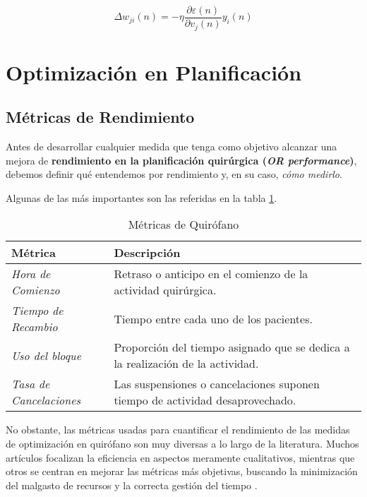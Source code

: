 \begin{equation}
    \Delta w_{ji}(n) = -\eta \frac{\partial \varepsilon (n)}{\partial v_{j}(n)}y_{i}(n)
\end{equation}


\newpage

\section{Optimización en Planificación}


\subsection{Métricas de Rendimiento}

Antes de desarrollar cualquier medida que tenga como objetivo alcanzar una mejora de \textbf{rendimiento en la planificación quirúrgica (\textit{OR performance})}, debemos definir qué entendemos por rendimiento y, en su caso, \textit{cómo medirlo}. 

Algunas de las más importantes son las referidas en  la tabla \ref{Métricas de Quirófano}.
\begin{table}[]
    \centering
    \begin{tabular}{p{7cm}|p{7cm}}
        \toprule
            \textbf{Métrica}   &  \textbf{Descripción}  \\
         \midrule
              \textit{Hora de Comienzo}  &  Retraso o anticipo en el comienzo de la actividad quirúrgica. \\
              \textit{Tiempo de Recambio }& Tiempo entre cada uno de los pacientes. \\
              \textit{Uso del bloque} & Proporción del tiempo asignado que se dedica a la realización de la actividad. \\
              \textit{Tasa de Cancelaciones} & Las suspensiones o cancelaciones suponen tiempo de actividad desaprovechado. \\
       \bottomrule
    \end{tabular}
    \caption{Métricas de Quirófano}
    \label{Métricas de Quirófano}
\end{table}

No obstante, las métricas usadas para cuantificar el rendimiento de las medidas de optimización en quirófano son muy diversas a lo largo de la literatura.
Muchos artículos focalizan la eficiencia en aspectos meramente cualitativos, mientras que otros se centran en mejorar las métricas más objetivas, buscando la minimización del malgasto de recursos y la correcta gestión del tiempo \cite{Schouten2023OperatingReview}.

